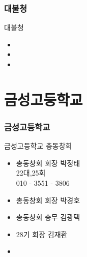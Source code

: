 \documentclass[aspectratio=1610,20pt,xcolor=pdftex,dvipsnames,table,handout]{beamer}
\begin{document}
		\begin{frame} [t,plain]
		\frametitle{대불청}

			\begin{block} {대불청}
			\setlength{\leftmargini}{2em}			
			\begin{itemize}
				\item 
				\item 
				\item 
			\end{itemize}
			\end{block}						
		\end{frame}						




		\section{금성고등학교}
		\begin{frame} [t,plain]
		\frametitle{금성고등학교}
			\begin{block} {금성고등학교 총동창회 }
			\setlength{\leftmargini}{2em}			
			\begin{itemize}
				\item 	총동창회 회장  \hrulefill 박정태 \\
						22대,25회	\\
						010 - 3551 - 3806
				\item 총동창회 회장  \hrulefill 박경호
				\item 총동창회 총무 \hrulefill 김광택
				\item 28기 회장	\hrulefill 	김재환
				\item 

			\end{itemize}
			\end{block}						
		\end{frame}						
\end{document}
